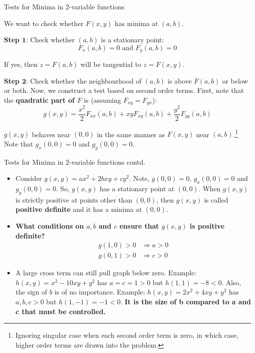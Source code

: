 \documentclass{beamer}
\begin{document}
\begin{frame}{Tests for Minima in 2-variable functions}{}
\begin{itemize}
    \item We want to check whether $F(x,y)$ has minima at $(a,b)$.
    \item {
        \textbf{Step $\mathbf{1}$}: Check whether $(a,b)$ is a stationary point:
        \begin{equation*}
            F_x(a,b) = 0 \text{ and } F_y(a,b) = 0
        \end{equation*}
        
    \item[o] If yes, then $z = F(a,b)$ will be tangential to $z = F(x,y)$.
        
    }
    \item {
        \textbf{Step $\mathbf{2}$}: Check whether the neighbourhood of $(a,b)$ is above $F(a,b)$ or below or both. Now, we construct a test based on second order terms. First, note that the \textbf{quadratic part of $F$} is (assuming $F_{xy} = F_{yx}$):
        \begin{equation*}
            g(x,y) = \frac{x^2}{2}F_{xx}(a,b) + xyF_{xy}(a,b) + \frac{y^2}{2}F_{yy}(a,b)
        \end{equation*}
    \item[o] $g(x,y)$ behaves near $(0,0)$ in the same manner as $F(x,y)$ near $(a,b)$.\footnote{Ignoring singular case when each second order term is zero, in which case, higher order terms are drawn into the problem.} Note that $g_x(0,0) = 0$ and $g_y(0,0) = 0$.
    }
\end{itemize}
\end{frame}

\begin{frame}{Tests for Minima in 2-variable functions contd.}{}
\begin{itemize}
    \item Consider $g(x,y) = ax^2 + 2bxy + cy^2$. Note, $g(0,0) = 0$, $g_{x}(0,0) = 0$ and  $g_{y}(0,0) = 0$. So, $g(x,y)$ has a stationary point at $(0,0)$. When $g(x,y)$ is strictly positive at points other than $(0,0)$, then $g(x,y)$ is called \textbf{positive definite} and it has a minima at $(0,0)$.
    \item {\textbf{What conditions on $a,b$ and $c$ ensure that $g(x,y)$ is positive definite?}
        \begin{align*}
            g(1,0) > 0 &\Rightarrow a > 0\\
            g(0,1) > 0 &\Rightarrow c > 0        
        \end{align*}
    }
    \item[o] A large cross term can still pull graph below zero. Example: $h(x,y) = x^2 - 10xy +y^2$ has $a = c = 1 > 0$ but $h(1,1) = -8 < 0$. Also, the sign of $b$ is of no importance. Example: $h(x,y) = 2x^2 + 4xy + y^2$ has $a,b,c > 0$ but $h(1,-1) = -1 < 0$. \textbf{It is the size of b compared to a and c that must be controlled.} 
\end{itemize}
\end{frame}
\end{document}
